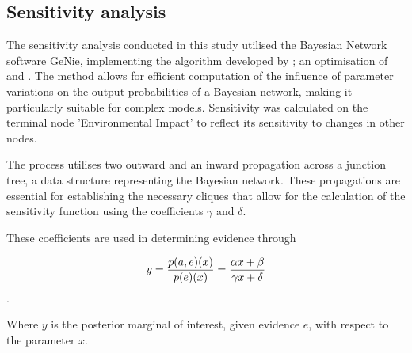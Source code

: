 \subsection{Sensitivity analysis}

The sensitivity analysis conducted in this study utilised the Bayesian Network software GeNie, implementing the algorithm developed by \cite{article}; an optimisation of \autocite{Castillo1996ANM} and \cite{Gaag1998PracticableSA}. The method allows for efficient computation of the influence of parameter variations on the output probabilities of a Bayesian network, making it particularly suitable for complex models. Sensitivity was calculated on the terminal node 'Environmental Impact' to reflect its sensitivity to changes in other nodes.

The process utilises two outward and an inward propagation across a junction tree, a data structure representing the Bayesian network. These propagations are essential for establishing the necessary cliques that allow for the calculation of the sensitivity function using the coefficients $\gamma$ and $\delta$.

These coefficients are used in determining evidence through

\begin{equation}
y = {{p(a, e)(x)}\over{p(e)(x)}}={{\alpha x + \beta}\over{\gamma x + \delta}}
\end{equation}.

Where $y$ is the posterior marginal of interest, given evidence $e$, with respect to the parameter $x$. 








